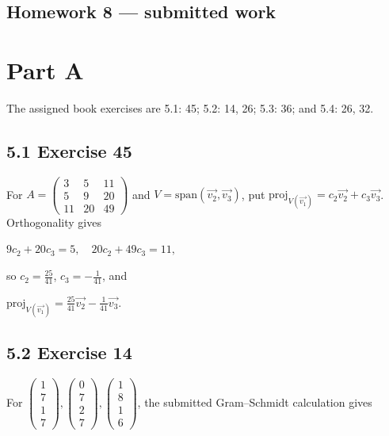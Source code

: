 \section{Homework 8 --- submitted work}

\chapter{Part A}

The assigned book exercises are 5.1: 45; 5.2: 14, 26; 5.3: 36; and 5.4: 26, 32.

\section{5.1 Exercise 45}

For \(A = \begin{pmatrix}
3 & 5 & 11 \\
5 & 9 & 20 \\
11 & 20 & 49
\end{pmatrix}\) and \(V = \text{span}\left( {\overrightarrow{v_{2}},\overrightarrow{v_{3}}} \right)\), put \(\text{proj}_{V{(\overrightarrow{v_{1}})}} = c_{2}\overrightarrow{v_{2}} + c_{3}\overrightarrow{v_{3}}\). Orthogonality gives

\(9c_{2} + 20c_{3} = 5,\quad 20c_{2} + 49c_{3} = 11,\)

so \(c_{2} = \frac{25}{41}\), \(c_{3} = - \frac{1}{41}\), and

\(\text{proj}_{V{(\overrightarrow{v_{1}})}} = \frac{25}{41}\overrightarrow{v_{2}} - \frac{1}{41}\overrightarrow{v_{3}}.\)

\section{5.2 Exercise 14}

For \(\begin{pmatrix}
1 \\
7 \\
1 \\
7
\end{pmatrix},\begin{pmatrix}
0 \\
7 \\
2 \\
7
\end{pmatrix},\begin{pmatrix}
1 \\
8 \\
1 \\
6
\end{pmatrix}\), the submitted Gram--Schmidt calculation gives

